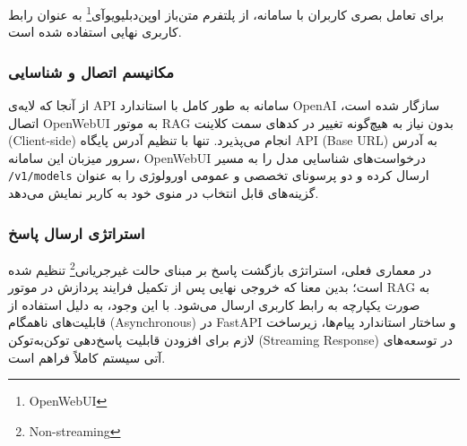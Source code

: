 برای تعامل بصری کاربران با سامانه، از پلتفرم متن‌باز اوپن‌دبلیو‌یو‌آی\footnote{OpenWebUI} به عنوان رابط کاربری نهایی استفاده شده است.

\subsubsection{مکانیسم اتصال و شناسایی}

از آنجا که لایه‌ی API سامانه به طور کامل با استاندارد OpenAI سازگار شده است، اتصال OpenWebUI به موتور RAG بدون نیاز به هیچ‌گونه تغییر در کدهای سمت کلاینت (Client-side) انجام می‌پذیرد. تنها با تنظیم آدرس پایگاه API (Base URL) به آدرس سرور میزبان این سامانه، OpenWebUI درخواست‌های شناسایی مدل را به مسیر \texttt{/v1/models} ارسال کرده و دو پرسونای تخصصی و عمومی اورولوژی را به عنوان گزینه‌های قابل انتخاب در منوی خود به کاربر نمایش می‌دهد.

\subsubsection{استراتژی ارسال پاسخ}

در معماری فعلی، استراتژی بازگشت پاسخ بر مبنای حالت غیرجریانی\footnote{Non-streaming} تنظیم شده است؛ بدین معنا که خروجی نهایی پس از تکمیل فرایند پردازش در موتور RAG به صورت یکپارچه به رابط کاربری ارسال می‌شود. با این وجود، به دلیل استفاده از قابلیت‌های ناهمگام (Asynchronous) در FastAPI و ساختار استاندارد پیام‌ها، زیرساخت لازم برای افزودن قابلیت پاسخ‌دهی توکن‌به‌توکن (Streaming Response) در توسعه‌های آتی سیستم کاملاً فراهم است.